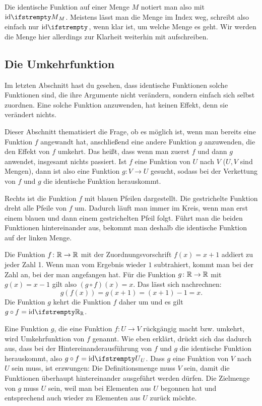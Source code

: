 \documentclass[../../main.tex]{subfiles}
\begin{document}
Die identische Funktion auf einer Menge $M$ notiert man also mit $\ident[M]$. Meistens lässt man die Menge im Index weg, schreibt also einfach nur $\ident$, wenn klar ist, um welche Menge es geht. Wir werden die Menge hier allerdings zur Klarheit weiterhin mit aufschreiben.

\subsection{Die Umkehrfunktion}
\label{sec:abbildungen_umkehrabbildung}

Im letzten Abschnitt hast du gesehen, dass identische Funktionen solche Funktionen sind, die ihre Argumente nicht verändern, sondern einfach sich selbst zuordnen. Eine solche Funktion anzuwenden, hat keinen Effekt, denn sie verändert nichts.

Dieser Abschnitt thematisiert die Frage, ob es möglich ist, wenn man bereits eine Funktion $f$ angewandt hat, anschließend eine andere Funktion $g$ anzuwenden, die den Effekt von $f$ umkehrt. Das heißt, dass wenn man zuerst $f$ und dann $g$ anwendet, insgesamt nichts passiert. Ist $f$ eine Funktion von $U$ nach $V$ ($U,V$ sind Mengen), dann ist also eine Funktion $g\colon V\rightarrow U$ gesucht, sodass bei der Verkettung von $f$ und $g$ die identische Funktion herauskommt.

\parpic[r]{
    
}

Rechts ist die Funktion $f$ mit blauen Pfeilen dargestellt. Die gestrichelte Funktion dreht alle Pfeile von $f$ um. Dadurch läuft man immer im Kreis, wenn man erst einem blauen und dann einem gestrichelten Pfeil folgt. Führt man die beiden Funktionen hintereinander aus, bekommt man deshalb die identische Funktion auf der linken Menge.

\begin{example}{}
    Die Funktion $f\colon\mathbb{R}\rightarrow\mathbb{R}$ mit der Zuordnungsvorschrift $f(x)=x+1$ addiert zu jeder Zahl 1. Wenn man vom Ergebnis wieder $1$ subtrahiert, kommt man bei der Zahl an, bei der man angefangen hat. Für die Funktion $g\colon\mathbb{R}\rightarrow\mathbb{R}$ mit $g(x)=x-1$ gilt also $(g\circ f)(x)=x$. Das lässt sich nachrechnen:
    \[g(f(x))=g(x+1)=(x+1)-1=x.\]
    Die Funktion $g$ kehrt die Funktion $f$ daher um und es gilt $g\circ f=\ident[\Real]$.
\end{example}

Eine Funktion $g$, die eine Funktion $f\colon U\rightarrow V$ rückgängig macht bzw. umkehrt, wird Umkehrfunktion von $f$ genannt. Wie eben erklärt, drückt sich das dadurch aus, dass bei der Hintereinanderausführung von $f$ und $g$ die identische Funktion herauskommt, also $g\circ f=\ident[U]$. Dass $g$ eine Funktion von $V$ nach $U$ sein muss, ist erzwungen: Die Definitionsmenge muss $V$ sein, damit die Funktionen überhaupt hintereinander ausgeführt werden dürfen. Die Zielmenge von $g$ muss $U$ sein, weil man bei Elementen aus $U$ begonnen hat und entsprechend auch wieder zu Elementen aus $U$ zurück möchte.
\end{document}
